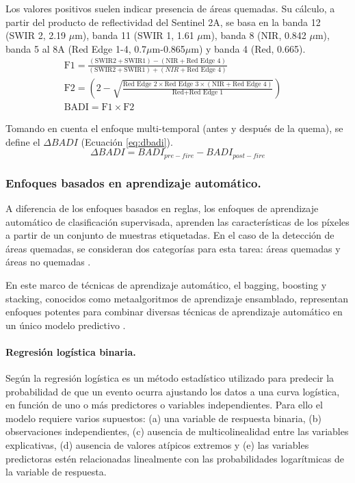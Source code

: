 Los valores positivos suelen indicar presencia de áreas quemadas. Su cálculo, a partir del producto de reflectividad del Sentinel 2A, se basa 
en la banda 12 (SWIR 2, 2.19 $\mu$m), banda 11 (SWIR 1, 1.61 $\mu$m), banda 8 (NIR, 0.842 $\mu$m), banda 5 al 8A (Red Edge 1-4, 0.7$\mu$m-0.865$\mu$m) 
y banda 4 (Red, 0.665).
\begin{subequations}
    \begin{gather}
        \text{F1} = \frac{(\text{SWIR2} + \text{SWIR1}) - (\text{NIR} + \text{Red Edge 4})}{(\text{SWIR2} + \text{SWIR1}) + (NIR + \text{Red Edge 4})} \quad\\
        \text{F2} = \left(2-\sqrt{\frac{\text{Red Edge 2} \times \text{Red Edge 3} \times (\text{NIR} + \text{Red Edge 4})}{\text{Red} + \text{Red Edge 1}}}\right) \quad\\
        \text{BADI} = \text{F1} \times \text{F2}  
        \label{eq:badi}      
    \end{gather}    
\end{subequations}

Tomando en cuenta el enfoque multi-temporal (antes y después de la quema), se define el $\Delta BADI$ (Ecuación \ref{eq:dbadi}).
\begin{equation}
    \Delta BADI = BADI_{pre-fire} - BADI_{post-fire}
    \label{eq:dbadi}
\end{equation}

\subsubsection{Enfoques basados en aprendizaje automático.}
A diferencia de los enfoques basados en reglas, los enfoques de aprendizaje automático de clasificación supervisada, aprenden las características de los píxeles a partir de un 
conjunto de muestras etiquetadas. En el caso de la detección de áreas quemadas, se consideran dos categorías para esta tarea: áreas quemadas y áreas no quemadas \citep{al_dabbagh_2023}.  

En este marco de técnicas de aprendizaje automático, el bagging, boosting y stacking, conocidos como metaalgoritmos de aprendizaje ensamblado, representan enfoques potentes para combinar diversas 
técnicas de aprendizaje automático en un único modelo predictivo \citep{saini_ensemble_2017}. 


\paragraph{Regresión logística binaria.}
Según \citet{militino_logistic_2024} la regresión logística es un método estadístico utilizado para predecir la probabilidad de que un evento ocurra ajustando los datos a una curva logística, en función de uno o más predictores o variables independientes. Para ello el modelo
requiere varios supuestos: (a) una variable de respuesta binaria, (b) observaciones independientes, (c) ausencia de multicolinealidad entre las variables explicativas, (d) ausencia de valores atípicos extremos y (e) las variables predictoras estén relacionadas linealmente con 
las probabilidades logarítmicas de la variable de respuesta.   

